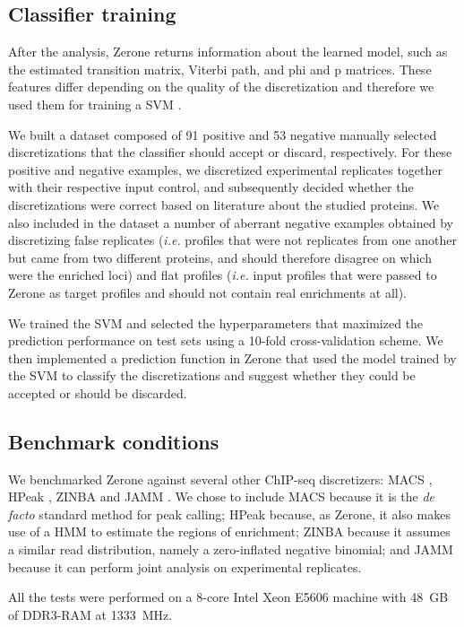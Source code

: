 \documentclass{bioinfo}
\begin{document}
\begin{methods}
\subsection{Classifier training}
After the analysis, Zerone returns information about the learned model, such as
the estimated transition matrix, Viterbi path, and phi and p matrices. These
features differ depending on the quality of the discretization and therefore we
used them for training a SVM \citep{e1071}.

We built a dataset composed of 91 positive and 53 negative manually selected
discretizations that the classifier should accept or discard, respectively.
For these positive and negative examples, we discretized experimental replicates
together with their respective input control, and subsequently decided whether
the discretizations were correct based on literature about the studied proteins.
We also included in the dataset a number of aberrant negative examples obtained
by discretizing false replicates (\emph{i.e.} profiles that were not replicates
from one another but came from two different proteins, and should therefore
disagree on which were the enriched loci) and flat profiles (\emph{i.e.} input
profiles that were passed to Zerone as target profiles and should not contain
real enrichments at all).

We trained the SVM and selected the hyperparameters that maximized the
prediction performance on test sets using a 10-fold cross-validation scheme. We
then implemented a prediction function in Zerone that used the model trained by
the SVM to classify the discretizations and suggest whether they could be
accepted or should be discarded.


\subsection{Benchmark conditions}
We benchmarked Zerone against several other ChIP-seq discretizers: MACS
\citep{Zhang2008}, HPeak \citep{Qin2010}, ZINBA \citep{Rashid2011} and
JAMM \citep{Ibrahim2014}. We chose to include MACS because it is the
\emph{de facto} standard method for peak calling; HPeak because, as Zerone, it
also makes use of a HMM to estimate the regions of enrichment; ZINBA because it
assumes a similar read distribution, namely a zero-inflated negative binomial;
and JAMM because it can perform joint analysis on experimental replicates.

All the tests were performed on a 8-core Intel Xeon E5606 machine with 48~GB of
DDR3-RAM at 1333~MHz.

\end{methods}
\end{document}
